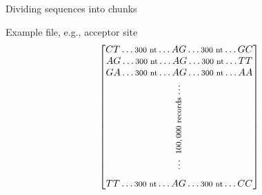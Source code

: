 \documentclass[10pt]{beamer}
\begin{document}
\begin{frame}{Dividing sequences into chunks}
	
	\large Example file, e.g., acceptor site
	\begin{align*}
	\begin{bmatrix}
	CT \dots \rotatebox{0}{\footnotesize $ 300 $ nt} \dots AG \dots \rotatebox{0}{\footnotesize $ 300 $ nt} \dots GC\\
	AG \dots \rotatebox{0}{\footnotesize $ 300 $ nt} \dots AG \dots \rotatebox{0}{\footnotesize $ 300 $ nt} \dots TT \\
	GA \dots \rotatebox{0}{\footnotesize $ 300 $ nt} \dots AG \dots \rotatebox{0}{\footnotesize $ 300 $ nt} \dots AA \\[0.2ex]
	\vdots\\
	\rotatebox{90}{\footnotesize$ ~100,000 $ records} \\[-1.3ex]
	\vdots \\[1.4ex]
	TT \dots \rotatebox{0}{\footnotesize $ 300 $ nt} \dots AG \dots \rotatebox{0}{\footnotesize $ 300 $ nt} \dots CC
	\end{bmatrix}
	\end{align*}
\end{frame}
\end{document}
